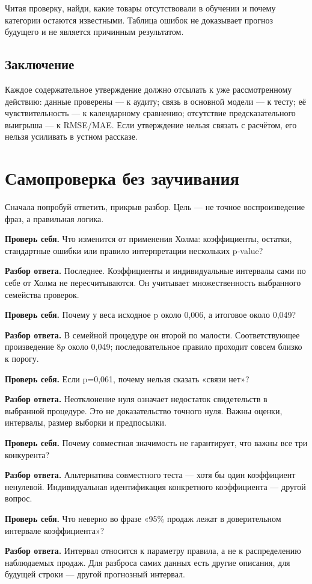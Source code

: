 \documentclass[12pt,a4paper]{article}
\newcommand{\check}[2]{\par\textbf{Проверь себя.} #1\par\textbf{Разбор ответа.} #2\par}
\begin{document}
Читая проверку, найди, какие товары отсутствовали в обучении и почему категории остаются известными. Таблица ошибок не доказывает прогноз будущего и не является причинным результатом.

\subsection*{Заключение}

Каждое содержательное утверждение должно отсылать к уже рассмотренному действию: данные проверены --- к аудиту; связь в основной модели --- к тесту; её чувствительность --- к календарному сравнению; отсутствие предсказательного выигрыша --- к RMSE/MAE. Если утверждение нельзя связать с расчётом, его нельзя усиливать в устном рассказе.

\section{Самопроверка без заучивания}

Сначала попробуй ответить, прикрыв разбор. Цель --- не точное воспроизведение фраз, а правильная логика.

\check{Что изменится от применения Холма: коэффициенты, остатки, стандартные ошибки или правило интерпретации нескольких p-value?}{Последнее. Коэффициенты и индивидуальные интервалы сами по себе от Холма не пересчитываются. Он учитывает множественность выбранного семейства проверок.}

\check{Почему у веса исходное p около 0,006, а итоговое около 0,049?}{В семейной процедуре он второй по малости. Соответствующее произведение $8p$ около 0,049; последовательное правило проходит совсем близко к порогу.}

\check{Если p=0,061, почему нельзя сказать «связи нет»?}{Неотклонение нуля означает недостаток свидетельств в выбранной процедуре. Это не доказательство точного нуля. Важны оценки, интервалы, размер выборки и предпосылки.}

\check{Почему совместная значимость не гарантирует, что важны все три конкурента?}{Альтернатива совместного теста --- хотя бы один коэффициент ненулевой. Индивидуальная идентификация конкретного коэффициента --- другой вопрос.}

\check{Что неверно во фразе «95\% продаж лежат в доверительном интервале коэффициента»?}{Интервал относится к параметру правила, а не к распределению наблюдаемых продаж. Для разброса самих данных есть другие описания, для будущей строки --- другой прогнозный интервал.}
\end{document}
